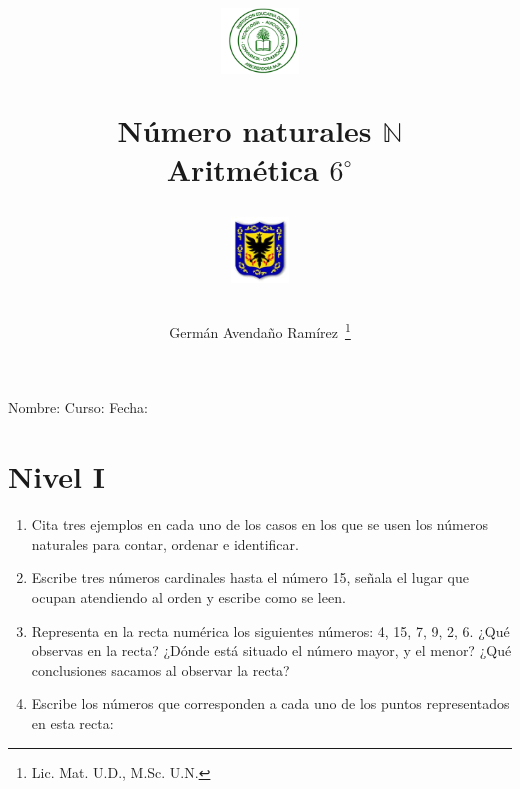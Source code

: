 \documentclass[twoside]{article}
\author{Germ\'an Avenda\~no Ram\'irez~\thanks{Lic. Mat. U.D., M.Sc. U.N.}}
\title{\begin{minipage}{.2\textwidth}
\includegraphics[height=1.75cm]{Images/logo-colegio.png}\end{minipage}
\begin{minipage}{.55\textwidth}
\begin{center}
Número naturales $\mathbb{N}$\\
Aritmética $6^{\circ}$
\end{center}
\end{minipage}\hfill
\begin{minipage}{.2\textwidth}
\includegraphics[height=1.75cm]{Images/logo-sed.png} 
\end{minipage}}
\date{}
\begin{document}
\maketitle
Nombre: \hrulefill Curso: \underline{\hspace*{44pt}} Fecha: \underline{\hspace*{2.5cm}}
\section*{Nivel I}
\begin{enumerate}
\item Cita tres ejemplos en cada uno de los casos en los que se
usen los números naturales para contar, ordenar e identificar.
\item Escribe tres números cardinales hasta el número 15, señala el lugar que ocupan atendiendo al orden y escribe como se leen.
\item Representa en la recta numérica los siguientes números: 4, 15, 7, 9, 2, 6. ¿Qué observas en la recta? ¿Dónde está situado el número mayor, y el menor? ¿Qué conclusiones sacamos al observar la recta?
\item Escribe los números que corresponden a cada uno de los
puntos representados en esta recta:


\end{enumerate}
\end{document}

